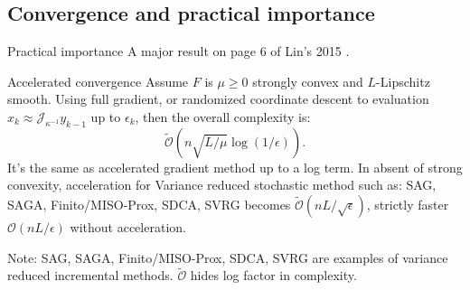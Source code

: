 \documentclass[11pt]{beamer}
\begin{document}
        \subsection{Convergence and practical importance}
            \begin{frame}{Practical importance}
                A major result on page 6 of Lin's 2015 \cite{lin_universal_2015}. 
                \begin{block}{Accelerated convergence}
                    Assume $F$ is $\mu\ge 0$ strongly convex and $L$-Lipschitz smooth. 
                    Using full gradient, or randomized coordinate descent to evaluation $x_k \approx \mathcal J_{\kappa^{-1}}y_{k - 1}$ up to $\epsilon_k$, then the overall complexity is:
                    $$
                        \widetilde{\mathcal O}\left(n \sqrt{L/\mu} \log(1/\epsilon)\right). 
                    $$
                    It's the same as accelerated gradient method up to a log term. 
                    In absent of strong convexity, acceleration for Variance reduced stochastic method such as: SAG, SAGA, Finito/MISO-Prox, SDCA, SVRG becomes $\widetilde {\mathcal O}(n L/\sqrt{\epsilon})$, strictly faster $\mathcal O(nL/\epsilon)$ without acceleration. 
                \end{block}
                Note: SAG, SAGA, Finito/MISO-Prox, SDCA, SVRG are examples of variance reduced incremental methods. 
                $\widetilde {\mathcal O}$ hides log factor in complexity. 
            \end{frame}
\end{document}
